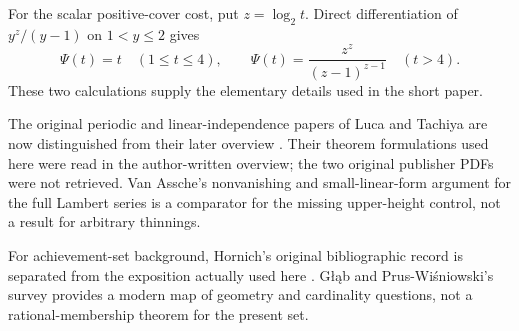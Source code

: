 \documentclass[11pt]{article}
\theoremstyle{plain}
\theoremstyle{definition}
\theoremstyle{remark}
\begin{document}
For the scalar positive-cover cost, put $z=\log_2t$.  Direct differentiation
of $y^z/(y-1)$ on $1<y\le2$ gives
\[
 \Psi(t)=t\quad(1\le t\le4),\qquad
 \Psi(t)=\frac{z^z}{(z-1)^{z-1}}\quad(t>4).
\]
These two calculations supply the elementary details used in the
short paper.

The original periodic and linear-independence papers of Luca and Tachiya
are now distinguished from their later overview
\cite{lucatachiya2014periodic,lucatachiya2014independence,lucatachiya2017}.
Their theorem formulations used here were read in the author-written
overview; the two original publisher PDFs were not retrieved.  Van Assche's nonvanishing and
small-linear-form argument for the full Lambert series
\cite[Lemma~1 and (34)--(35)]{vanassche2001} is a comparator for the missing
upper-height control, not a result for arbitrary thinnings.

For achievement-set background, Hornich's original bibliographic record
\cite{hornich1941} is separated from the exposition actually used here
\cite{nitecki2013}.  G\l\k{a}b and Prus-Wi\'sniowski's survey
\cite{glabprus2025} provides a modern map of geometry and cardinality
questions, not a rational-membership theorem for the present set.

\begingroup
\newcommand{\mword}[4]{\href{https://github.com/wcook04/plectis-erdos/blob/99f4bf47422abbd8757cbb22b50ba079d764d3a7/#1\#L#2}{#4}}
\newcommand{\lword}[4]{\href{https://github.com/wcook04/plectis-erdos/blob/99f4bf47422abbd8757cbb22b50ba079d764d3a7/ErdosProblems/#1\#L#2}{#4}}
\end{document}
